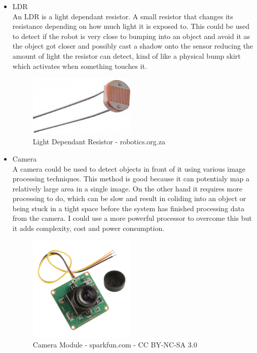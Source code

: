 \begin{itemize}
\item LDR
\\An LDR is a light dependant resistor.  A small resistor that changes its resistance depending on how much light it is exposed to.  This could be used to detect if the robot is very close to bumping into an object and avoid it as the object got closer and possibly cast a shadow onto the sensor reducing the amount of light the resistor can detect, kind of like a physical bump skirt which activates when something touches it.
\begin{figure}[h]
\centering
        \includegraphics[width=2.0in] {Images/ldr.jpg}
        \caption{Light Dependant Resistor - robotics.org.za}
        \label{Light Dependant Resistor}
\end{figure}

\item Camera
\\A camera could be used to detect objects in front of it using various image processing techniques.  This method is good because it can potentialy map a relatively large area in a single image.  On the other hand it requires more processing to do, which can be slow and result in coliding into an object or being stuck in a tight space before the system has finished processing data from the camera.  I could use a more powerful processor to overcome this but it adds complexity, cost and power consumption.
\begin{figure}[h]
\centering
        \includegraphics[width=2.0in] {Images/camera.jpg}
        \caption{Camera Module - sparkfun.com - CC BY-NC-SA 3.0}
        \label{Camera Module}
\end{figure}


\end{itemize}
